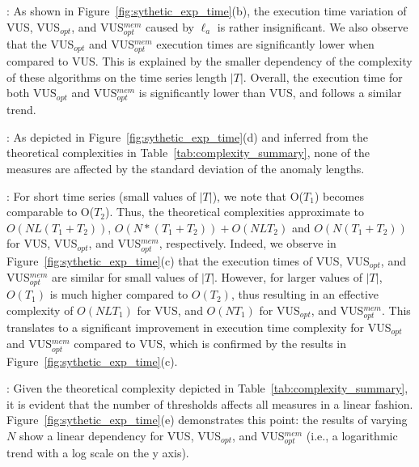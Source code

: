 \vspace{0.2cm}
:
As shown in Figure~\ref{fig:sythetic_exp_time}(b), the execution time variation of VUS, VUS$_{opt}$, and VUS$_{opt}^{mem}$ caused by $\ell_a$ is rather insignificant. 
We also observe that the VUS$_{opt}$ and VUS$_{opt}^{mem}$ execution times are significantly lower when compared to VUS. 
This is explained by the smaller dependency of the complexity of these algorithms on the time series length $|T|$. 
Overall, the execution time for both VUS$_{opt}$ and VUS$_{opt}^{mem}$ is significantly lower than VUS, and follows a similar trend. 

\vspace{0.2cm}
: 
As depicted in Figure~\ref{fig:sythetic_exp_time}(d) and inferred from the theoretical complexities in Table~\ref{tab:complexity_summary}, none of the measures are affected by the standard deviation of the anomaly lengths.

\vspace{0.2cm}
\noindent {\bf [Influence of $|T|$]}:
For short time series (small values of $|T|$), we note that O($T_1$) becomes comparable to O($T_2$). 
Thus, the theoretical complexities approximate to $O(NL(T_1+T_2))$, $O(N*(T_1+T_2))+O(NLT_2)$ and $O(N(T_1+T_2))$ for VUS, VUS$_{opt}$, and VUS$_{opt}^{mem}$, respectively. 
Indeed, we observe in Figure~\ref{fig:sythetic_exp_time}(c) that the execution times of VUS, VUS$_{opt}$, and VUS$_{opt}^{mem}$ are similar for small values of $|T|$. However, for larger values of $|T|$, $O(T_1)$ is much higher compared to $O(T_2)$, thus resulting in an effective complexity of $O(NLT_1)$ for VUS, and $O(NT_1)$ for VUS$_{opt}$, and VUS$_{opt}^{mem}$. 
This translates to a significant improvement in execution time complexity for VUS$_{opt}$ and VUS$_{opt}^{mem}$ compared to VUS, which is confirmed by the results in Figure~\ref{fig:sythetic_exp_time}(c).

\vspace{0.2cm}
\noindent {\bf [Influence of $N$]}: 
Given the theoretical complexity depicted in Table~\ref{tab:complexity_summary}, it is evident that the number of thresholds affects all measures in a linear fashion.
Figure~\ref{fig:sythetic_exp_time}(e) demonstrates this point: the results of varying $N$ show a linear dependency for VUS, VUS$_{opt}$, and VUS$_{opt}^{mem}$ (i.e., a logarithmic trend with a log scale on the y axis). 

